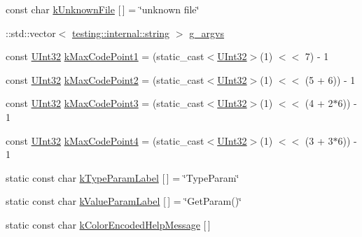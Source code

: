 \begin{DoxyCompactItemize}
const char \hyperlink{namespacetesting_1_1internal_abae7a5775c901f2fd12b058b00d09840}{k\+Unknown\+File} \mbox{[}$\,$\mbox{]} = \char`\"{}unknown file\char`\"{}
\item 
\+::std\+::vector$<$ \hyperlink{namespacetesting_1_1internal_a8e8ff5b11e64078831112677156cb111}{testing\+::internal\+::string} $>$ \hyperlink{namespacetesting_1_1internal_ab7fe90df4f87f1bd8a244b0be2ccad79}{g\+\_\+argvs}
\item 
const \hyperlink{namespacetesting_1_1internal_a40d4fffcd2bf56f18b1c380615aa85e3}{U\+Int32} \hyperlink{namespacetesting_1_1internal_a128515c8ed6c0fe98e498c8042da2060}{k\+Max\+Code\+Point1} = (static\+\_\+cast$<$\hyperlink{namespacetesting_1_1internal_a40d4fffcd2bf56f18b1c380615aa85e3}{U\+Int32}$>$(1) $<$$<$ 7) -\/ 1
\item 
const \hyperlink{namespacetesting_1_1internal_a40d4fffcd2bf56f18b1c380615aa85e3}{U\+Int32} \hyperlink{namespacetesting_1_1internal_ab8f4a5ed784352f00342cfeadc72337e}{k\+Max\+Code\+Point2} = (static\+\_\+cast$<$\hyperlink{namespacetesting_1_1internal_a40d4fffcd2bf56f18b1c380615aa85e3}{U\+Int32}$>$(1) $<$$<$ (5 + 6)) -\/ 1
\item 
const \hyperlink{namespacetesting_1_1internal_a40d4fffcd2bf56f18b1c380615aa85e3}{U\+Int32} \hyperlink{namespacetesting_1_1internal_aa42bd507418e570402996e33582beed3}{k\+Max\+Code\+Point3} = (static\+\_\+cast$<$\hyperlink{namespacetesting_1_1internal_a40d4fffcd2bf56f18b1c380615aa85e3}{U\+Int32}$>$(1) $<$$<$ (4 + 2$\ast$6)) -\/ 1
\item 
const \hyperlink{namespacetesting_1_1internal_a40d4fffcd2bf56f18b1c380615aa85e3}{U\+Int32} \hyperlink{namespacetesting_1_1internal_acd87c60be9b5fedb2d017503d8834474}{k\+Max\+Code\+Point4} = (static\+\_\+cast$<$\hyperlink{namespacetesting_1_1internal_a40d4fffcd2bf56f18b1c380615aa85e3}{U\+Int32}$>$(1) $<$$<$ (3 + 3$\ast$6)) -\/ 1
\item 
static const char \hyperlink{namespacetesting_1_1internal_ae6e5e31b85dac8586d4cc1ab1671f438}{k\+Type\+Param\+Label} \mbox{[}$\,$\mbox{]} = \char`\"{}Type\+Param\char`\"{}
\item 
static const char \hyperlink{namespacetesting_1_1internal_ae57eee0bf5371ff8e9688fb4464bc62b}{k\+Value\+Param\+Label} \mbox{[}$\,$\mbox{]} = \char`\"{}Get\+Param()\char`\"{}
\item 
static const char \hyperlink{namespacetesting_1_1internal_a159395e649dd7728b09b25f70847f1ca}{k\+Color\+Encoded\+Help\+Message} \mbox{[}$\,$\mbox{]}
\end{DoxyCompactItemize}


